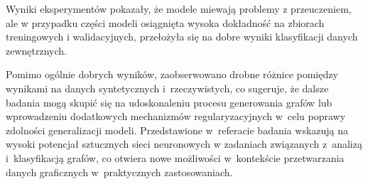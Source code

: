 Wyniki eksperymentów pokazały, że modele miewają problemy z przeuczeniem,
ale w przypadku części modeli osiągnięta wysoka dokładność na zbiorach treningowych i walidacyjnych,
przełożyła się na dobre wyniki klasyfikacji danych zewnętrznych.

Pomimo ogólnie dobrych wyników,
zaobserwowano drobne różnice pomiędzy wynikami na danych syntetycznych i~rzeczywistych,
co sugeruje, że dalsze badania mogą skupić się na udoskonaleniu procesu generowania grafów
lub wprowadzeniu dodatkowych mechanizmów regularyzacyjnych w~celu poprawy zdolności generalizacji modeli.
Przedstawione w~referacie badania wskazują na wysoki potencjał sztucznych sieci neuronowych
w zadaniach związanych z~analizą i~klasyfikacją grafów,
co otwiera nowe możliwości w~kontekście przetwarzania danych graficznych w~praktycznych zastosowaniach.